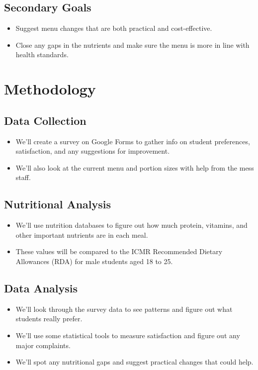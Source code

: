 \documentclass[12pt,a4paper]{article}
\begin{document}
\subsection{Secondary Goals}
\begin{itemize}
    \item Suggest menu changes that are both practical and cost-effective.
    \item Close any gaps in the nutrients and make sure the menu is more in line with health standards.
\end{itemize}

\section{Methodology}
\subsection{Data Collection}
\begin{itemize}
    \item We’ll create a survey on Google Forms to gather info on student preferences, satisfaction, and any suggestions for improvement.
    \item We’ll also look at the current menu and portion sizes with help from the mess staff.
\end{itemize}

\subsection{Nutritional Analysis}
\begin{itemize}
    \item We’ll use nutrition databases to figure out how much protein, vitamins, and other important nutrients are in each meal.
    \item These values will be compared to the ICMR Recommended Dietary Allowances (RDA) for male students aged 18 to 25.
\end{itemize}

\subsection{Data Analysis}
\begin{itemize}
    \item We’ll look through the survey data to see patterns and figure out what students really prefer.
    \item We’ll use some statistical tools to measure satisfaction and figure out any major complaints.
    \item We’ll spot any nutritional gaps and suggest practical changes that could help.
\end{itemize}
\end{document}
